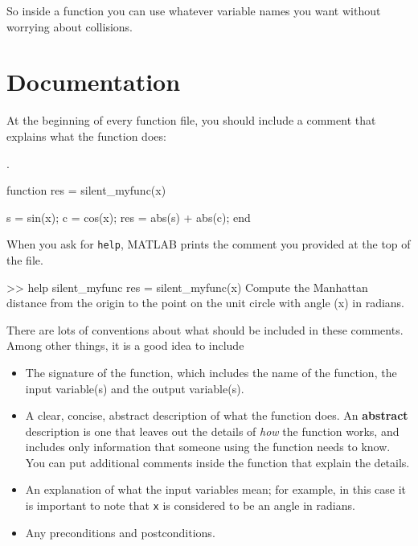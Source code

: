 \documentclass[
]{book}
\numberwithin{Answer}{chapter}
\numberwithin{Exercise}{chapter}
\begin{document}
So inside a function you can use whatever variable names you
want without worrying about collisions.



\section{Documentation}

At the beginning of every function file, you should include a comment
that explains what the function does:

.

\begin{code}

function res = silent_myfunc(x)

    s = sin(x);
    c = cos(x);
    res = abs(s) + abs(c);
end
\end{code}

When you ask for {\tt help}, MATLAB prints the comment you provided at the top of the file.

\begin{code}
>> help silent_myfunc
  res = silent_myfunc(x)
  Compute the Manhattan distance from the origin to the
  point on the unit circle with angle (x) in radians.
\end{code}

There are lots of conventions about what should be included
in these comments.  Among other things, it is a good idea to
include

\begin{itemize}

\item The signature of the function, which includes the name
of the function, the input variable(s) and the output variable(s).

\item A clear, concise, abstract description of what the function does.
An {\bf abstract} description is one that leaves out the
details of {\em how} the function works, and includes only information
that someone using the function needs to know.  You can put additional
comments inside the function that explain the details.

\item An explanation of what the input variables mean; for example,
in this case it is important to note that {\tt x} is considered
to be an angle in radians.

\item Any preconditions and postconditions.

\end{itemize}
\end{document}
